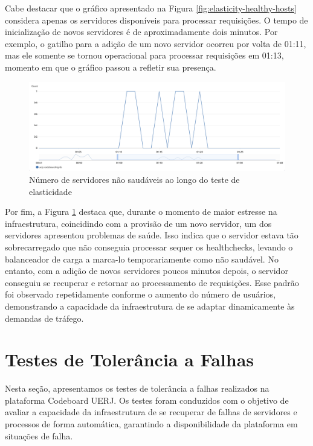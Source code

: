 Cabe destacar que o gráfico apresentado na Figura \ref{fig:elasticity-healthy-hosts} considera apenas os servidores disponíveis para processar requisições. O tempo de inicialização de novos servidores é de aproximadamente dois minutos. Por exemplo, o gatilho para a adição de um novo servidor ocorreu por volta de 01:11, mas ele somente se tornou operacional para processar requisições em 01:13, momento em que o gráfico passou a refletir sua presença.

\begin{figure}[H]
    \centering
    \includegraphics[width=1\textwidth]{assets/elasticity-test/unhealthy-hosts.png}
    \caption{Número de servidores não saudáveis ao longo do teste de elasticidade}
    \label{fig:elasticity-unhealthy-hosts}
\end{figure}

Por fim, a Figura \ref{fig:elasticity-unhealthy-hosts} destaca que, durante o momento de maior estresse na infraestrutura, coincidindo com a provisão de um novo servidor, um dos servidores apresentou problemas de saúde. Isso indica que o servidor estava tão sobrecarregado que não conseguia processar sequer os healthchecks, levando o balanceador de carga a marca-lo temporariamente como não saudável. No entanto, com a adição de novos servidores poucos minutos depois, o servidor conseguiu se recuperar e retornar ao processamento de requisições. Esse padrão foi observado repetidamente conforme o aumento do número de usuários, demonstrando a capacidade da infraestrutura de se adaptar dinamicamente às demandas de tráfego.


\section{Testes de Tolerância a Falhas}

Nesta seção, apresentamos os testes de tolerância a falhas realizados na plataforma Codeboard UERJ. Os testes foram conduzidos com o objetivo de avaliar a capacidade da infraestrutura de se recuperar de falhas de servidores e processos de forma automática, garantindo a disponibilidade da plataforma em situações de falha.

